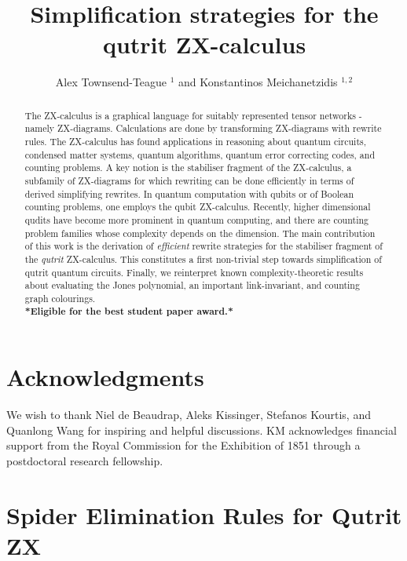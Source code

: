 \documentclass[runningheads]{llncs}
\title{Simplification strategies for the\\
qutrit ZX-calculus}
\author{Alex Townsend-Teague $^{1}$ and Konstantinos Meichanetzidis $^{1,2}$
	\institute{$^1$ University of Oxford \\ $^2$ Cambridge Quantum Computing Ltd.}
}
\begin{document}
\maketitle
\begin{abstract}
	The ZX-calculus is a graphical language for suitably represented tensor networks - namely ZX-diagrams.
	Calculations are done by transforming ZX-diagrams with rewrite rules.
	The ZX-calculus has found applications in reasoning about quantum circuits, condensed matter systems, quantum algorithms, quantum error correcting codes, and counting problems.
	A key notion is the stabiliser fragment of the ZX-calculus, a subfamily of ZX-diagrams for which rewriting can be done efficiently in terms of derived simplifying rewrites.
	In quantum computation with qubits or of Boolean counting problems, one employs the qubit ZX-calculus.
	Recently, higher dimensional qudits have become more prominent in quantum computing, and there are counting problem families whose complexity depends on the dimension.
	The main contribution of this work is the derivation of
	\emph{efficient} rewrite strategies for the stabiliser fragment of the \emph{qutrit} ZX-calculus.
	This constitutes a first non-trivial step towards simplification of qutrit quantum circuits. Finally, we reinterpret known complexity-theoretic results about evaluating the Jones polynomial, an important link-invariant, and counting graph colourings.\\
	\textbf{*Eligible for the best student paper award.*}
\end{abstract}







\section{Acknowledgments}
We wish to thank Niel de Beaudrap, Aleks Kissinger, Stefanos 
Kourtis, and Quanlong Wang for inspiring and helpful discussions.
KM acknowledges financial support from the Royal Commission for the Exhibition of 1851 through a postdoctoral research fellowship.

% 



\appendix



\section{Spider Elimination Rules for Qutrit ZX}




\end{document}
